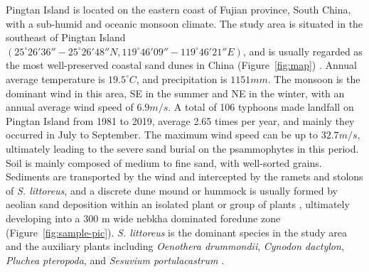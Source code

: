 \documentclass[]{interact}
\theoremstyle{plain}%
\theoremstyle{definition}
\theoremstyle{remark}
\begin{document}
Pingtan Island is located on the eastern coast of Fujian province, South China, with a sub-humid and oceanic monsoon climate. The study area is situated in the southeast of Pingtan Island $(25^{\circ}26'36''-25^{\circ}26'48''N, 119^{\circ}46'09''-119^{\circ}46'21''E)$, and is usually regarded as the most well-preserved coastal sand dunes in China (Figure~\ref{fig:map}) 
\citep{yangDiurnalvariationcharacteristics2017}. 
Annual average temperature is $19.5^{\circ}C$, and precipitation is $1151 mm$. The monsoon is the dominant wind in this area, SE in the summer and NE in the winter, with an annual average wind speed of $6.9 m/s$. A total of 106 typhoons made landfall on Pingtan Island from 1981 to 2019, average 2.65 times per year, and mainly they occurred in July to September. The maximum wind speed can be up to $32.7 m/s$, ultimately leading to the severe sand burial on the psammophytes in this period. Soil is mainly composed of medium to fine sand, with well-sorted grains. Sediments are transported by the wind and intercepted by the ramets and stolons of \textit{S. littoreus}, and a discrete dune mound or hummock is usually formed by aeolian sand deposition within an isolated plant or group of plants \citep{hespCFDFlowDynamics2019}, ultimately developing into a 300 m wide nebkha dominated foredune zone (Figure~\ref{fig:sample-pic}). \textit{S. littoreus} is the dominant species in the study area and the auxiliary plants including \textit{Oenothera drummondii}, \textit{Cynodon dactylon}, \textit{Pluchea pteropoda}, and \textit{Sesuvium portulacastrum} \citep{yangDiurnalvariationcharacteristics2017}. 
\end{document}

